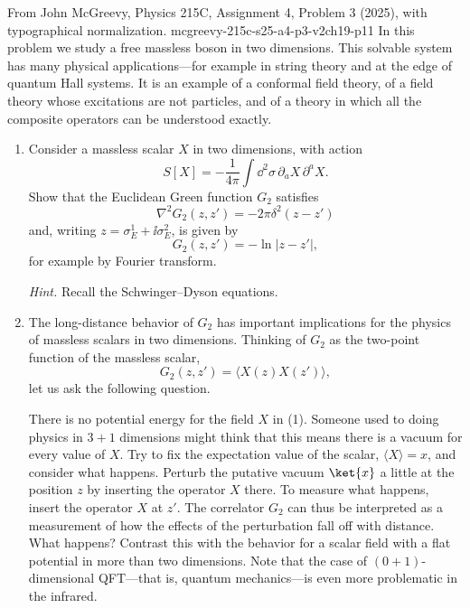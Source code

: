 \begin{enumerate}
  {From John McGreevy, Physics 215C, Assignment 4, Problem 3 (2025), with
  typographical normalization.}
  {mcgreevy-215c-s25-a4-p3-v2ch19-p11}
  In this problem we study a free massless boson in two dimensions.  This
  solvable system has many physical applications---for example in string
  theory and at the edge of quantum Hall systems.  It is an example of a
  conformal field theory, of a field theory whose excitations are not
  particles, and of a theory in which all the composite operators can be
  understood exactly.

  \begin{enumerate}
    \item[(a)] Consider a massless scalar \(X\) in two dimensions, with action
    \[
      S[X]= -\frac{1}{4\pi}\int \dd^2\sigma\,
      \partial_aX\,\partial^aX .
      \tag{1}
    \]
    Show that the Euclidean Green function \(G_2\) satisfies
    \[
      \nabla^2G_2(z,z')=-2\pi\delta^2(z-z')
      \tag{2}
    \]
    and, writing \(z=\sigma_E^1+\ii\sigma_E^2\), is given by
    \[
      G_2(z,z')=-\ln|z-z'|,
    \]
    for example by Fourier transform.

    \emph{Hint.} Recall the Schwinger--Dyson equations.

    \item[(b)] The long-distance behavior of \(G_2\) has important implications
    for the physics of massless scalars in two dimensions.  Thinking of
    \(G_2\) as the two-point function of the massless scalar,
    \[
      G_2(z,z')=\langle X(z)X(z')\rangle,
    \]
    let us ask the following question.

    There is no potential energy for the field \(X\) in (1).  Someone used
    to doing physics in \(3+1\) dimensions might think that this means there
    is a vacuum for every value of \(X\).  Try to fix the expectation value
    of the scalar, \(\langle X\rangle=x\), and consider what happens.  Perturb
    the putative vacuum \(\ket{x}\) a little at the position \(z\) by
    inserting the operator \(X\) there.  To measure what happens, insert the
    operator \(X\) at \(z'\).  The correlator \(G_2\) can thus be interpreted
    as a measurement of how the effects of the perturbation fall off with
    distance.  What happens?  Contrast this with the behavior for a scalar
    field with a flat potential in more than two dimensions.  Note that the
    case of \((0+1)\)-dimensional QFT---that is, quantum mechanics---is even
    more problematic in the infrared.


\end{enumerate}
\end{enumerate}
